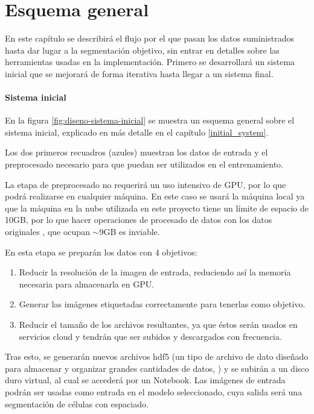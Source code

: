 \chapter{Esquema general}\label{requisitos}

En este capítulo se describirá el flujo por el que pasan los datos suministrados hasta dar lugar a la segmentación objetivo, sin entrar en detalles sobre las herramientas usadas en la implementación. Primero se desarrollará un sistema inicial que se mejorará de forma iterativa hasta llegar a un sistema final.

\subsubsection{Sistema inicial}


En la figura \ref{fig:diseno-sistema-inicial} se muestra un esquema general sobre el sistema inicial, explicado en más detalle en el capítulo \ref{initial_system}. 

Los dos primeros recuadros (azules) muestran los datos de entrada y el preprocesado necesario para que puedan ser utilizados en el entrenamiento.

La etapa de preprocesado no requerirá un uso intensivo de GPU, por lo que podrá realizarse en cualquier máquina. En este caso se usará la máquina local ya que la máquina en la nube utilizada en este proyecto tiene un límite de espacio de 10GB, por lo que hacer operaciones de procesado de datos con los datos originales , que ocupan $\sim$9GB es inviable.

En esta etapa se preparán los datos con 4 objetivos:
\begin{enumerate}
\item Reducir la resolución de la imagen de entrada, reduciendo así la memoria necesaria para almacenarla en GPU.
\item Generar las imágenes etiquetadas correctamente para tenerlas como objetivo.
\item Reducir el tamaño de los archivos resultantes, ya que éstos serán usados en servicios cloud y tendrán que ser subidos y descargados con frecuencia.
\end{enumerate}

Tras esto, se generarán nuevos archivos hdf5 (un tipo de archivo de dato diseñado para almacenar y organizar grandes cantidades de datos, \cite{Koziol2011}) y se subirán a un disco duro virtual, al cual se accederá por un Notebook. Las imágenes de entrada podrán ser usadas como entrada en el modelo seleccionado, cuya salida será una segmentación de células con espaciado.

